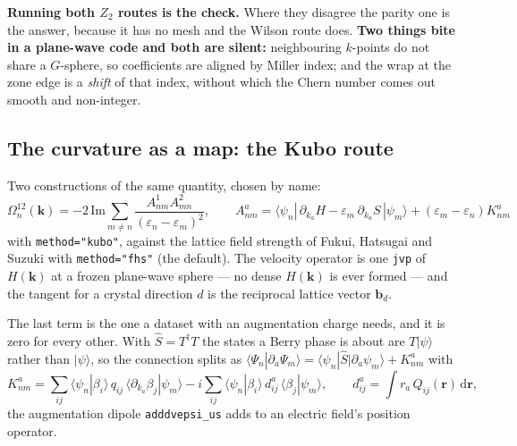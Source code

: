 \documentclass[11pt,a4paper]{article}
\newcommand{\code}[1]{\texttt{\small #1}}
\begin{document}
\textbf{Running both $Z_2$ routes is the check.} Where they disagree the parity
one is the answer, because it has no mesh and the Wilson route does.
\textbf{Two things bite in a plane-wave code and both are silent:} neighbouring
$k$-points do not share a $G$-sphere, so coefficients are aligned by Miller
index; and the wrap at the zone edge is a \emph{shift} of that index, without
which the Chern number comes out smooth and non-integer.

\subsection{The curvature as a map: the Kubo route}

Two constructions of the same quantity, chosen by name:
\begin{equation*}
  \Omega_n^{12}(\mathbf k) = -2\,\mathrm{Im}
  \sum_{m \neq n}
  \frac{A^{1}_{nm} A^{2}_{mn}}{(\varepsilon_n - \varepsilon_m)^2},
  \qquad
  A^{a}_{nm} = \langle \psi_n |\, \partial_{k_a} H - \varepsilon_m\,
  \partial_{k_a} S \,| \psi_m \rangle
  + (\varepsilon_m - \varepsilon_n) K^{a}_{nm}
\end{equation*}
with \code{method="kubo"}, against the lattice field strength of Fukui,
Hatsugai and Suzuki with \code{method="fhs"} (the default). The velocity
operator is one \code{jvp} of $H(\mathbf k)$ at a frozen plane-wave sphere ---
no dense $H(\mathbf k)$ is ever formed --- and the tangent for a crystal
direction $d$ is the reciprocal lattice vector $\mathbf b_d$.

The last term is the one a dataset with an augmentation charge needs, and it is
zero for every other. With $\hat S = T^\dagger T$ the states a Berry phase is
about are $T|\psi\rangle$ rather than $|\psi\rangle$, so the connection splits
as $\langle\Psi_n|\partial_a\Psi_m\rangle = \langle\psi_n|\hat S|\partial_a
\psi_m\rangle + K^a_{nm}$ with
\begin{equation*}
  K^{a}_{nm} = \sum_{ij}\langle\psi_n|\beta_i\rangle\,q_{ij}\,
  \langle\partial_{k_a}\beta_j|\psi_m\rangle
  - i\sum_{ij}\langle\psi_n|\beta_i\rangle\,
  d^{a}_{ij}\,\langle\beta_j|\psi_m\rangle,
  \qquad
  d^{a}_{ij} = \int r_a\,Q_{ij}(\mathbf r)\,\mathrm d\mathbf r,
\end{equation*}
the augmentation dipole \code{adddvepsi\_us} adds to an electric field's
position operator.
\end{document}
